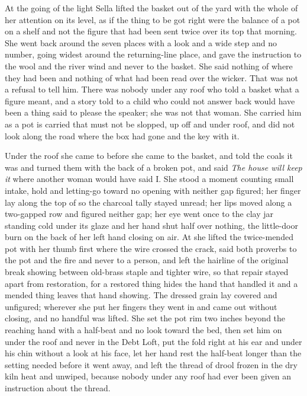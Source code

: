 At the going of the light Sella lifted the basket out of the yard with the whole of her attention on its level, as if the thing to be got right were the balance of a pot on a shelf and not the figure that had been sent twice over its top that morning. She went back around the seven places with a look and a wide step and no number, going widest around the returning-line place, and gave the instruction to the wool and the river wind and never to the basket. She said nothing of where they had been and nothing of what had been read over the wicker. That was not a refusal to tell him. There was nobody under any roof who told a basket what a figure meant, and a story told to a child who could not answer back would have been a thing said to please the speaker; she was not that woman. She carried him as a pot is carried that must not be slopped, up off  and under  roof, and did not look along the road where the box had gone and the key with it.

Under the roof she came to  before she came to the basket, and told the coals it was  and turned them with the back of a broken pot, and said \emph{The house will keep it} where another woman would have said I. She stood a moment counting small intake, hold and letting-go toward no opening with neither gap figured; her finger lay along the top of  so the charcoal tally stayed unread; her lips moved along a two-gapped row and figured neither gap; her eye went once to the clay jar standing cold under its glaze and her hand shut half over nothing, the little-door burn on the back of her left hand closing on air. At  she lifted the twice-mended pot with her thumb first where the wire crossed the crack, said both proverbs to the pot and the fire and never to a person, and left the hairline of the original break showing between old-brass staple and tighter wire, so that repair stayed apart from restoration, for a restored thing hides the hand that handled it and a mended thing leaves that hand showing. The dressed grain lay covered and unfigured; wherever she put her fingers they went in and came out without closing, and no handful was lifted. She set the pot rim two inches beyond the reaching hand with a half-beat and no look toward the bed, then set him on  under the roof and never in the Debt Loft, put the fold right at his ear and under his chin without a look at his face, let her hand rest the half-beat longer than the setting needed before it went away, and left the thread of drool frozen in the dry kiln heat and unwiped, because nobody under any roof had ever been given an instruction about the thread.

